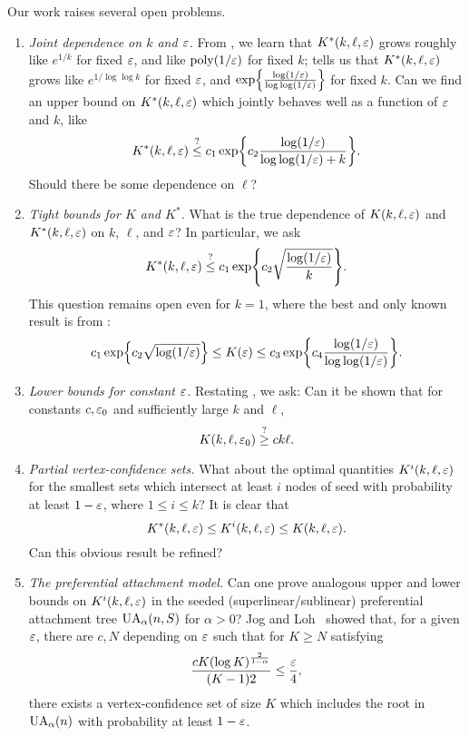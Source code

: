 Our work raises several open problems.
\begin{enumerate}[label=\textit{\arabic*.}]
\item \textit{Joint dependence on $k$ and $\varepsilon$.} From , we learn that $K^*(k, \ell, \varepsilon)$
  grows roughly like $e^{1/k}$ for fixed $\varepsilon$, and like
  $\mathrm{poly}(1/\varepsilon)$ for fixed $k$;
   tells us that
  $K^*(k, \ell, \varepsilon)$ grows like $e^{1/\log \log k}$ for fixed
  $\varepsilon$, and
  $\exp\left\{\frac{\log (1/\eps)}{\log \log (1/\eps)}\right\}$ for
  fixed $k$. Can we find an upper bound on $K^*(k, \ell, \varepsilon)$ which
  jointly behaves well as a function of $\varepsilon$ and $k$, like
  \[
    K^*(k, \ell, \eps) \overset{?}{\le} c_1 \exp\left\{c_2 \frac{\log (1/\eps)}{\log \log (1/\eps) + k} \right\} .
  \]
  Should there be some dependence on $\ell$?

\item \textit{Tight bounds for $K$ and $K^*$.} What is the true dependence of $K(k, \ell, \varepsilon)$ and
  $K^*(k, \ell, \varepsilon)$ on $k$, $\ell$, and $\varepsilon$? In particular, we
  ask
  \[
    K^*(k, \ell, \eps) \overset{?}{\le} c_1 \exp\left\{c_2 \sqrt{\frac{\log
          (1/\eps)}{k}} \right\} .
  \]
  This question remains open even for $k = 1$, where the best and only
  known result is from \cite{finding-adam}:
  \[
    c_1 \exp\left\{ c_2 \sqrt{\log (1/\eps)} \right\}
    \le K(\eps) \le c_3 \exp\left\{c_4 \frac{\log (1/\eps)}{\log
          \log(1/\eps)} \right\} .
  \]

\item \textit{Lower bounds for constant $\varepsilon$.} Restating
  , we ask: Can it be shown that
  for constants $c, \varepsilon_0$ and sufficiently large $k$ and $\ell$,
  \[
    K(k, \ell, \varepsilon_0) \overset{?}{\ge} c k \ell .
  \]
  
\item \textit{Partial vertex-confidence sets.}
  What about the optimal quantities $K^i(k, \ell, \varepsilon)$ for the
  smallest sets which intersect at least $i$ nodes of seed with
  probability at least $1 - \varepsilon$, where $1 \le i \le k$? It is clear
  that
  \[
    K^*(k, \ell, \varepsilon) \le K^i(k, \ell, \varepsilon) \le K(k, \ell, \varepsilon) .
  \]
  Can this obvious result be refined?

\item \textit{The preferential attachment model.} Can one prove
  analogous upper and lower bounds on $K^i(k, \ell, \varepsilon)$ in the
  seeded (superlinear/sublinear) preferential attachment tree
  $\operatorname{UA}_\alpha(n, S)$ for $\alpha > 0$? Jog and
  Loh~\cite{ling-centrality} showed that, for a given $\varepsilon$, there
  are $c, N$ depending on $\varepsilon$ such that for $K \ge N$ satisfying
  \[
    \frac{c K (\log K)^{\frac{2}{1 - \alpha}}}{(K - 1)2} \le \frac{\varepsilon}{4} ,
  \]
  there exists a vertex-confidence set of size $K$ which includes the
  root in $\operatorname{UA}_\alpha(n)$ with probability at least $1 - \varepsilon$.


\end{enumerate}
